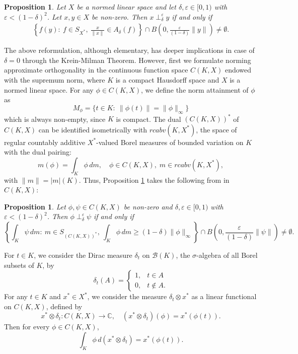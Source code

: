 \documentclass[11pt, reqno]{amsart}
\newtheorem{proposition}[theorem]{Proposition}
\theoremstyle{definition}
\newcommand{\nperp}{\perp_{\delta}^\varepsilon}
\begin{document}
\begin{proposition}\label{prop:intersection}
Let $X$ be a normed linear space and let $\delta,\varepsilon\in [0,1)$ with $\varepsilon < (1-\delta)^2$.  Let $x,y\in X$ be non-zero. Then $x\nperp y$ if and only if
\begin{align}\label{Intersection}
\left\{f(y):~f\in S_{X^*},~\frac{x}{\|x\|}\in A_\delta(f)\right\}\cap B\left(0,\frac{\varepsilon}{(1-\delta)}\|y\|\right) \neq \emptyset.
\end{align}
\end{proposition}


\noindent The above reformulation, although elementary, has deeper implications in case of $\delta=0$ through the Krein-Milman Theorem. However, first we formulate norming approximate orthogonality in the continuous function space $C(K,X)$ endowed with the supremum norm, where $K$ is a compact Hausdorff space and $X$ is a normed linear space. For any $\phi\in C(K,X)$, we define the norm attainment of $\phi$ as
\[
M_\phi = \{t\in K:~\|\phi(t)\|=\|\phi\|_\infty\}
\]
which is always non-empty, since $K$ is compact. The dual $(C(K,X))^*$ of $C(K,X)$ can be identified isometrically with $rcabv(K,X^*)$, the space of regular countably additive $X^*$-valued Borel measures 
of bounded variation on $K$ with the dual pairing:
\[
m(\phi) = \int_K \phi \, dm, \quad \phi \in C(K,X),\; m \in rcabv(K,X^*),
\]
with $\|m\| = |m|(K)$. Thus, Proposition \ref{prop:intersection} takes the following from in $C(K,X)$:

\begin{proposition}\label{Prop:Intersection}
Let $\phi, \psi \in C(K,X)$  be non-zero and $\delta,\varepsilon\in [0,1)$ with $\varepsilon < (1-\delta)^2$. Then $\phi\nperp \psi$ if and only if
\[
\left\{ \int_K \psi \, dm:~  m\in S_{(C(K,X))^*},~ \int_K \phi \, dm\geq (1-\delta)\|\phi\|_\infty\right\} \cap B\left(0,\frac{\varepsilon}{(1-\delta)}\|\psi\|\right) \neq \emptyset.
\]
\end{proposition}

\medskip


\noindent For $t \in K$, we consider the Dirac measure $\delta_t$ on $\mathcal{B}(K)$, the $\sigma$-algebra of all Borel subsets of $K$, by
\[
\delta_t(A)=\begin{cases}
1, & t\in A\\
0, & t\notin A.
\end{cases}
\]
For any $t\in K$ and $x^* \in X^*$, we consider the measure $\delta_t\otimes x^*$ as a linear functional on $C(K,X)$, defined by
\[
x^* \otimes \delta_t : C(K,X) \to \mathbb{C}, 
\quad (x^* \otimes \delta_t)(\phi) = x^*(\phi(t)).
\]
Then for every $\phi \in C(K,X)$,
\[
\int_K \phi \, d(x^* \otimes \delta_t) = x^*(\phi(t)).
\]
\end{document}
